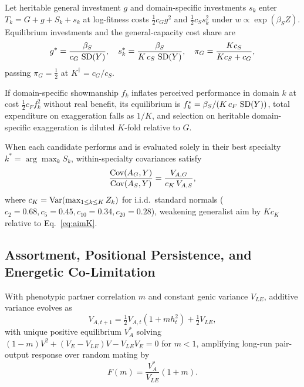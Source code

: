 \begin{proposition}\label{prop:polymath}
Let heritable general investment $g$ and domain-specific investments $s_k$ enter $T_k=G+g+S_k+s_k$ at log-fitness costs $\tfrac12c_Gg^2$ and $\tfrac12c_Ss_k^2$ under $w\propto\exp(\beta_SZ)$. Equilibrium investments and the general-capacity cost share are
\begin{equation}
g^*=\frac{\beta_S}{c_G\,\operatorname{SD}(Y)},\quad s_k^*=\frac{\beta_S}{K\,c_S\,\operatorname{SD}(Y)},\quad \pi_G=\frac{Kc_S}{Kc_S+c_G},\label{eq:gstar}
\end{equation}
passing $\pi_G=\tfrac12$ at $K^\dagger=c_G/c_S$.
\end{proposition}

\begin{corollary}\label{cor:inflation}
If domain-specific showmanship $f_k$ inflates perceived performance in domain $k$ at cost $\tfrac12c_Ff_k^2$ without real benefit, its equilibrium is $f_k^*=\beta_S/(K\,c_F\,\operatorname{SD}(Y))$, total expenditure on exaggeration falls as $1/K$, and selection on heritable domain-specific exaggeration is diluted $K$-fold relative to $G$.
\end{corollary}

\begin{proposition}\label{prop:division}
When each candidate performs and is evaluated solely in their best specialty $k^*=\arg\max_k S_k$, within-specialty covariances satisfy
\begin{equation}
\frac{\operatorname{Cov}(A_G,Y)}{\operatorname{Cov}(A_S,Y)}=\frac{V_{A,G}}{c_K\,V_{A,S}},\label{eq:division}
\end{equation}
where $c_K=\operatorname{Var}(\max_{1\le k\le K}Z_k)$ for i.i.d.\ standard normals ($c_2=0.68,c_5=0.45,c_{10}=0.34,c_{20}=0.28$), weakening generalist aim by $Kc_K$ relative to Eq.~\eqref{eq:aimK}.
\end{proposition}

\subsection{Assortment, Positional Persistence, and Energetic Co-Limitation}
\begin{proposition}\label{prop:assort}
With phenotypic partner correlation $m$ and constant genic variance $V_{LE}$, additive variance evolves as
\begin{equation}
V_{A,t+1}=\tfrac12V_{A,t}(1+mh_t^2)+\tfrac12V_{LE},\label{eq:assort}
\end{equation}
with unique positive equilibrium $V_A^*$ solving $(1-m)V^2+(V_E-V_{LE})V-V_{LE}V_E=0$ for $m<1$, amplifying long-run pair-output response over random mating by
\begin{equation}
F(m)=\frac{V_A^*}{V_{LE}}(1+m).\label{eq:F}
\end{equation}
\end{proposition}


